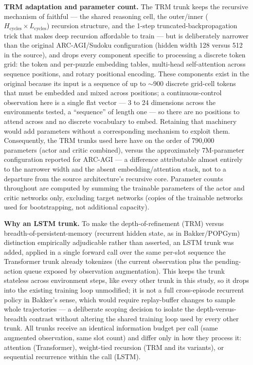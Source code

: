 \documentclass[11pt]{article}
\begin{document}
\textbf{TRM adaptation and parameter count.} The TRM trunk keeps the recursive mechanism of \citet{jolicoeurmartineau2025trm} faithful --- the shared reasoning cell, the outer/inner ($H_{\text{cycles}} \times L_{\text{cycles}}$) recursion structure, and the 1-step truncated-backpropagation trick that makes deep recursion affordable to train --- but is deliberately narrower than the original ARC-AGI/Sudoku configuration (hidden width 128 versus 512 in the source), and drops every component specific to processing a discrete token grid: the token and per-puzzle embedding tables, multi-head self-attention across sequence positions, and rotary positional encoding. These components exist in the original because its input is a sequence of up to $\sim$900 discrete grid-cell tokens that must be embedded and mixed across positions; a continuous-control observation here is a single flat vector --- 3 to 24 dimensions across the environments tested, a ``sequence'' of length one --- so there are no positions to attend across and no discrete vocabulary to embed. Retaining that machinery would add parameters without a corresponding mechanism to exploit them. Consequently, the TRM trunks used here have on the order of 790{,}000 parameters (actor and critic combined), versus the approximately 7M-parameter configuration reported for ARC-AGI --- a difference attributable almost entirely to the narrower width and the absent embedding/attention stack, not to a departure from the source architecture's recursive core. Parameter counts throughout are computed by summing the trainable parameters of the actor and critic networks only, excluding target networks (copies of the trainable networks used for bootstrapping, not additional capacity).

\textbf{Why an LSTM trunk.} To make the depth-of-refinement (TRM) versus breadth-of-persistent-memory (recurrent hidden state, as in Bakker/POPGym) distinction empirically adjudicable rather than asserted, an LSTM trunk was added, applied in a single forward call over the same per-slot sequence the Transformer trunk already tokenizes (the current observation plus the pending-action queue exposed by observation augmentation). This keeps the trunk stateless across environment steps, like every other trunk in this study, so it drops into the existing training loop unmodified; it is not a full cross-episode recurrent policy in Bakker's sense, which would require replay-buffer changes to sample whole trajectories --- a deliberate scoping decision to isolate the depth-versus-breadth contrast without altering the shared training loop used by every other trunk. All trunks receive an identical information budget per call (same augmented observation, same slot count) and differ only in how they process it: attention (Transformer), weight-tied recursion (TRM and its variants), or sequential recurrence within the call (LSTM).
\end{document}
